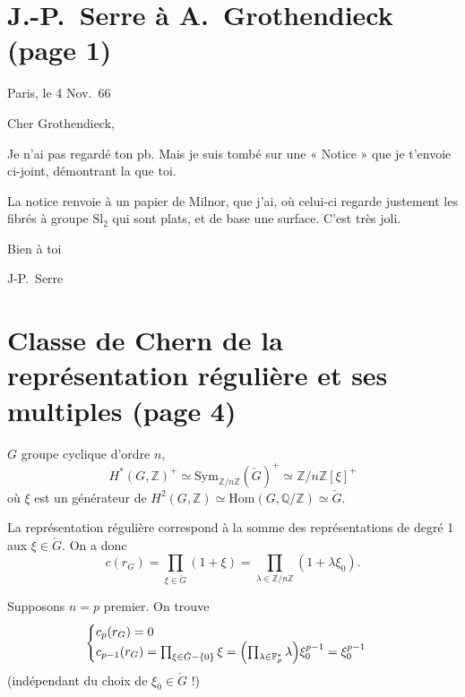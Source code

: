 \documentclass[11pt,a4paper]{article}
\begin{document}
\section*{J.-P.\ Serre à A.\ Grothendieck (page 1)}


Paris, le 4 Nov.\ 66

Cher Grothendieck,

Je n'ai pas regardé ton pb. Mais je suis tombé sur une « Notice » que je
t'envoie ci-joint, démontrant la  que toi.

La notice renvoie à un papier de Milnor, que j'ai, où celui-ci regarde
justement les fibrés à groupe $\mathrm{Sl}_2$ qui sont plats, et de base une
surface. C'est très joli.

Bien à toi

J-P.\ Serre

\section*{Classe de Chern de la représentation régulière et ses multiples (page 4)}


$G$ groupe cyclique d'ordre $n$,
\[
H^{*}(G, \mathbb{Z})^{+} \simeq
\mathrm{Sym}_{\mathbb{Z}/n\mathbb{Z}}(\check{G})^{+} \simeq
\mathbb{Z}/n\mathbb{Z}[\xi]^{+}
\]
où $\xi$ est un générateur de $H^{2}(G,\mathbb{Z}) \simeq
\mathrm{Hom}(G,\mathbb{Q}/\mathbb{Z}) \simeq \check{G}$.

La représentation régulière   correspond à
la somme des représentations de degré 1  aux
$\xi \in \check{G}$. On a donc
\[
c(r_{G}) = \prod_{\xi \in \check{G}} (1 + \xi)
= \prod_{\lambda \in \mathbb{Z}/n\mathbb{Z}} (1 + \lambda \xi_{0}) .
\]

Supposons $n = p$ premier. On trouve
\[
\begin{cases}
c_{p}(r_{G}) = 0 \\
c_{p-1}(r_{G}) = \prod_{\xi \in \check{G} - \{0\}} \xi
= \Bigl(\prod_{\lambda \in \mathbb{F}_{p}^{*}} \lambda\Bigr) \xi_{0}^{p-1}
= \xi_{0}^{p-1}
\end{cases}
\]
(indépendant du choix de $\xi_{0} \in \check{G}$ !)
\end{document}
